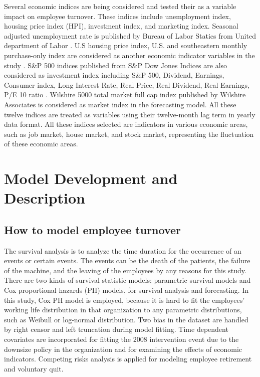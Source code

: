 \documentclass[12pt,letterpaper]{article}
\begin{document}
Several economic indices are being considered and tested their as a variable impact on employee turnover. These indices include unemployment index, housing price index (HPI), investment index, and marketing index. Seasonal adjusted unemployment rate is published by Bureau of Labor Statics from United department of Labor \citep{unemployment}. U.S housing price index, U.S. and southeastern monthly purchase-only index are considered as another economic indicator variables in the study \citep{HPI}. S\&P 500 indices published from S\&P Dow Jones Indices are also considered as investment index including S\&P 500, Dividend, Earnings, Consumer index, Long Interest Rate, Real Price, Real Dividend, Real Earnings, P/E 10 ratio \citep{sp500}. Wilshire 5000 total market full cap index published by Wilshire Associates is considered as market index in the forecasting model\citep{will5000}. All these twelve indices are treated as variables using their twelve-month lag term in yearly data format. All these indices selected are indicators in various economic areas, such as job market, house market, and stock market, representing the fluctuation of these economic areas.    

\section{Model Development and Description} 
\subsection{How to model employee turnover}
The survival analysis is to analyze the time duration for the occurrence of an events or certain events. The events can be the death of the patients, the failure of the machine, and the leaving of the employees by any reasons for this study. There are two kinds of survival statistic models: parametric survival models and Cox proportional hazards (PH) models, for survival analysis and forecasting. In this study, Cox PH model is employed, because it is hard to fit the employees' working life distribution in that organization to any parametric distributions, such as Weibull or log-normal distribution. Two bias in the dataset are handled by right censor and left truncation during model fitting. Time dependent covariates are incorporated for fitting the 2008 intervention event due to the downsize policy in the organization and for examining the effects of economic indicators. Competing risks analysis is applied for modeling employee retirement and voluntary quit. %
\end{document}
